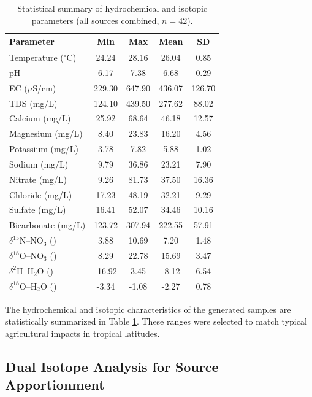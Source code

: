 \documentclass[12pt,a4paper]{article}
\begin{document}
\begin{table}[htbp]
	\centering
	\caption{Statistical summary of hydrochemical and isotopic parameters (all sources combined, $n=42$).}
	\label{tab:data_summary}
	\begin{tabular}{lcccc}
		\toprule
		Parameter & Min & Max & Mean & SD \\
		\midrule
		Temperature ($^\circ$C) & 24.24 & 28.16 & 26.04 & 0.85 \\
		pH & 6.17 & 7.38 & 6.68 & 0.29 \\
		EC ($\mu$S/cm) & 229.30 & 647.90 & 436.07 & 126.70 \\
		TDS (mg/L) & 124.10 & 439.50 & 277.62 & 88.02 \\
		Calcium (mg/L) & 25.92 & 68.64 & 46.18 & 12.57 \\
		Magnesium (mg/L) & 8.40 & 23.83 & 16.20 & 4.56 \\
		Potassium (mg/L) & 3.78 & 7.82 & 5.88 & 1.02 \\
		Sodium (mg/L) & 9.79 & 36.86 & 23.21 & 7.90 \\
		Nitrate (mg/L) & 9.26 & 81.73 & 37.50 & 16.36 \\
		Chloride (mg/L) & 17.23 & 48.19 & 32.21 & 9.29 \\
		Sulfate (mg/L) & 16.41 & 52.07 & 34.46 & 10.16 \\
		Bicarbonate (mg/L) & 123.72 & 307.94 & 222.55 & 57.91 \\
		$\delta^{15}$N--NO$_3$ (\textperthousand) & 3.88 & 10.69 & 7.20 & 1.48 \\
		$\delta^{18}$O--NO$_3$ (\textperthousand) & 8.29 & 22.78 & 15.69 & 3.47 \\
		$\delta^2$H--H$_2$O (\textperthousand) & -16.92 & 3.45 & -8.12 & 6.54 \\
		$\delta^{18}$O--H$_2$O (\textperthousand) & -3.34 & -1.08 & -2.27 & 0.78 \\
		\bottomrule
	\end{tabular}
\end{table}

The hydrochemical and isotopic characteristics of the generated samples are statistically summarized in Table \ref{tab:data_summary}. These ranges were selected to match typical agricultural impacts in tropical latitudes.

\subsection{Dual Isotope Analysis for Source Apportionment}
\end{document}
